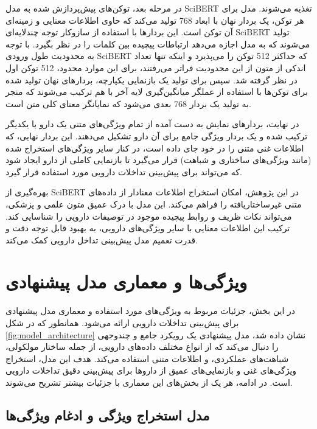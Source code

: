 در مرحله بعد، توکن‌های پیش‌پردازش شده به مدل SciBERT تغذیه می‌شوند. مدل برای هر توکن، یک بردار نهان با ابعاد 768 تولید می‌کند که حاوی اطلاعات معنایی و زمینه‌ای آن توکن است. این بردارها با استفاده از سازوکار توجه چندلایه‌ای SciBERT تولید می‌شوند که به مدل اجازه می‌دهد ارتباطات پیچیده بین کلمات را در نظر بگیرد. با توجه به محدودیت طول ورودی SciBERT که حداکثر 512 توکن را می‌پذیرد و اینکه تنها تعداد اندکی از متون از این محدودیت فراتر می‌رفتند، برای این موارد محدود، 512 توکن اول در نظر گرفته شد. سپس برای تولید یک بازنمایی یکپارچه، بردارهای نهان تولید شده برای توکن‌ها با استفاده از عملگر میانگین‌گیری لایه آخر با هم ترکیب می‌شوند که منجر به تولید یک بردار 768 بعدی می‌شود که نمایانگر معنای کلی متن است.

در نهایت، بردارهای نمایش به دست آمده از تمام ویژگی‌های متنی یک دارو با یکدیگر ترکیب شده و یک بردار ویژگی جامع برای آن دارو تشکیل می‌دهند. این بردار نهایی، که اطلاعات غنی متنی را در خود جای داده است، در کنار سایر ویژگی‌های استخراج شده (مانند ویژگی‌های ساختاری و شباهت) قرار می‌گیرد تا بازنمایی کاملی از دارو ایجاد شود که می‌تواند برای پیش‌بینی تداخلات دارویی مورد استفاده قرار گیرد.

بهره‌گیری از SciBERT در این پژوهش، امکان استخراج اطلاعات معنادار از داده‌های متنی غیرساختاریافته را فراهم می‌کند. این مدل با درک عمیق متون علمی و پزشکی، می‌تواند نکات ظریف و روابط پیچیده موجود در توصیفات دارویی را شناسایی کند. ترکیب این اطلاعات معنایی با سایر ویژگی‌های دارویی، به بهبود قابل توجه دقت و قدرت تعمیم مدل پیش‌بینی تداخل دارویی کمک می‌کند.

\section{ویژگی‌ها و معماری مدل پیشنهادی}

در این بخش، جزئیات مربوط به ویژگی‌های مورد استفاده و معماری مدل پیشنهادی برای پیش‌بینی تداخلات دارویی ارائه می‌شود. همانطور که در شکل \ref{fig:model_architecture} نشان داده شد، مدل پیشنهادی یک رویکرد جامع و چندوجهی را دنبال می‌کند که از انواع مختلف داده‌های دارویی، از جمله ساختار مولکولی، شباهت‌های عملکردی، و اطلاعات متنی استفاده می‌کند. هدف این مدل، استخراج ویژگی‌های غنی و بازنمایی‌های عمیق از داروها برای پیش‌بینی دقیق تداخلات دارویی است. در ادامه، هر یک از بخش‌های این معماری با جزئیات بیشتر تشریح می‌شوند.

\subsection{مدل استخراج ویژگی و ادغام ویژگی‌ها}

